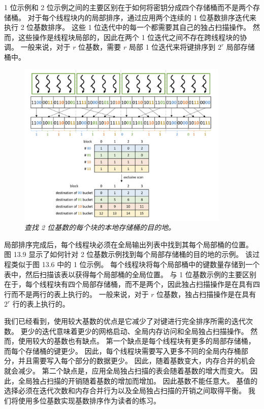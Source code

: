 1 位示例和 2 位示例之间的主要区别在于如何将密钥分成四个存储桶而不是两个存储桶。 
对于每个线程块内的局部排序，通过应用两个连续的 1 位基数排序迭代来执行 2 位基数排序。 
这些 1 位迭代中的每一个都需要其自己的独占扫描操作。 
然而，这些操作是线程块局部的，因此在两个 1 位迭代之间不存在跨线程块的协调。 
一般来说，对于 $r$ 位基数，需要 $r$ 局部 1 位迭代来将键排序到 $2^{r}$ 局部存储桶中。

\begin{figure}[H]
	\centering
	\includegraphics[width=0.9\textwidth]{figs/F13.9.png}
	\caption{\textit{查找 2 位基数的每个块的本地存储桶的目的地。}}
\end{figure}

局部排序完成后，每个线程块必须在全局输出列表中找到其每个局部桶的位置。 
图 13.9 显示了如何针对 2 位基数示例找到每个局部存储桶的目的地的示例。 该过程类似于图 13.6 中的 1 位示例。 
每个线程块将每个局部桶中的键数量存储到一个表中，然后扫描该表以获得每个局部桶的全局位置。 
与 1 位基数示例的主要区别在于，每个线程块有四个局部存储桶，而不是两个，因此独占扫描操作是在具有四行而不是两行的表上执行的。 
一般来说，对于 $r$ 位基数，独占扫描操作是在具有 $2^{r}$ 行的表上执行的。

我们已经看到，使用较大基数的优点是它减少了对键进行完全排序所需的迭代次数。 
更少的迭代意味着更少的网格启动、全局内存访问和全局独占扫描操作。 然而，使用较大的基数也有缺点。 
第一个缺点是每个线程块有更多的局部存储桶，而每个存储桶的键更少。 
因此，每个线程块需要写入更多不同的全局内存桶部分，并且需要写入每个部分的数据更少。 
因此，随着基数变大，内存合并的机会就会减少。 第二个缺点是，应用全局独占扫描的表会随着基数的增大而变大。 
因此，全局独占扫描的开销随着基数的增加而增加。 因此基数不能任意大。 
基值的选择必须在迭代次数和内存合并行为以及全局独占扫描的开销之间取得平衡。 我们将使用多位基数实现基数排序作为读者的练习。

